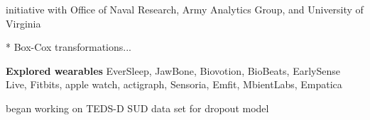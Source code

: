 
    initiative with Office of Naval Research, Army Analytics Group, and
    University of Virginia


    * Box-Cox transformations...

  \item\leftandright
    {\textbf{Explored wearables}}
    EverSleep, JawBone, Biovotion, BioBeats, EarlySense Live, Fitbits,
    apple watch, actigraph, Sensoria, Emfit, MbientLabs, Empatica


    
    began working on TEDS-D SUD data set for dropout model
